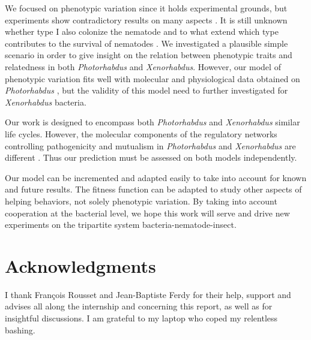 \documentclass[10pt]{article}
\newcommand{\Xeno}{\textit{Xenorhabdus} }
\newcommand{\Photo}{\textit{Photorhabdus} }
\begin{document}
\begin{multicols}{2}
We focused on phenotypic variation since it holds experimental grounds, but experiments show contradictory results on many aspects \cite{Somvanshi2012}.
It is still unknown whether type I also colonize the nematode and to what extend which type contributes to the survival of nematodes \cite{Waterfield2009}. 
We investigated a plausible simple scenario in order to give insight on the relation between phenotypic traits and relatedness in both \Photo and \textit{Xenorhabdus}.
However, our model of phenotypic variation fits well with molecular and physiological data obtained on \textit{Photorhabdus} \cite{Somvanshi2012}, but the validity of this model need to further investigated for \Xeno bacteria. 

Our work is designed to encompass both \Photo and \Xeno similar life cycles.  
However, the molecular components of the regulatory networks controlling pathogenicity and mutualism in \Photo and \Xeno are different \cite{Goodrich-Blair2007}. 
Thus our prediction must be assessed on both models independently.

Our model can be incremented and adapted easily to take into account for known and future results.
The fitness function can be adapted to study other aspects of helping behaviors, not solely phenotypic variation.
By taking into account cooperation at the bacterial level, we hope this work will serve and drive new experiments on the tripartite system bacteria-nematode-insect.
\section*{Acknowledgments}
I thank François Rousset and Jean-Baptiste Ferdy for their help, support and advises all along the internship and concerning this report, as well as for insightful discussions.
I am grateful to my laptop who coped my relentless bashing.


\end{multicols}
\end{document}
